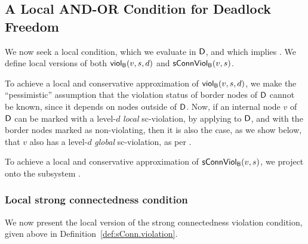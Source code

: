 

   \subsection{A Local AND-OR Condition for Deadlock Freedom}
   \label{s:ANDORcond}
%   



We now seek a local condition, which we evaluate in $\dsk{\act}{\l}$, and which implies \GAO.
We define local versions of both $\scViol{v}{d}{s}$ and $\connViol{v}{s}$.

To achieve a local and conservative approximation of $\scViol{v}{d}{s}$, we make the ``pessimistic'' assumption that the violation status of border
nodes of $\dsk{\act}{\l}$ cannot be known, since it depends on nodes outside of $\dsk{\act}{\l}$.  Now, if an internal node $v$ of $\dsk{\act}{\l}$
can be marked with a level-$d$ \emph{local} sc-violation, by applying  to $\dsk{\act}{\l}$, and with the
border nodes marked as non-violating, then it is also the case, as we show below, that $v$ also has a level-$d$ \emph{global} sc-violation, as per .

To achieve a local and conservative approximation of
$\connViol{v}{s}$, we project onto the subsystem \DS.


\subsubsection{Local strong connectedness condition}

We now present the local version of the strong connectedness violation condition, given above in Definition~\ref{def:sConn.violation}.

